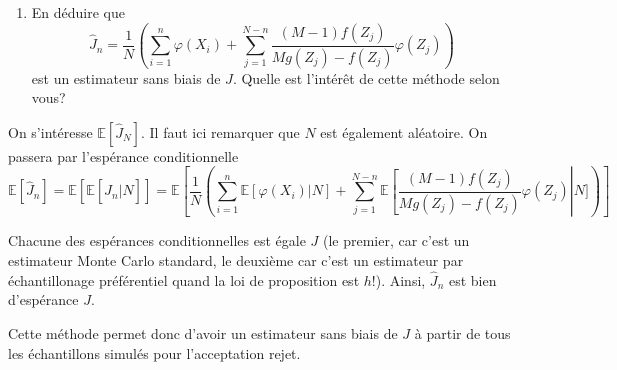 \documentclass[
]{article}
\providecommand{\tightlist}{%
  \setlength{\itemsep}{0pt}\setlength{\parskip}{0pt}}
\newenvironment{Correction}%
  { \vspace{\baselineskip}\begin{mdframed}[backgroundcolor=my_green]}%
  {\end{mdframed}}
\begin{document}
\begin{enumerate}
\def\labelenumi{\arabic{enumi}.}
\setcounter{enumi}{5}
\tightlist
\item
  En déduire que
  \[\hat{J}_n = \frac{1}{N} \left(\sum_{i = 1}^n \varphi(X_i) + \sum_{j = 1}^{N - n} \frac{(M - 1)f(Z_j)}{Mg(Z_j) - f(Z_j)} \varphi(Z_j) \right)\]
  est un estimateur sans biais de \(J\). Quelle est l'intérêt de cette
  méthode selon vous?
\end{enumerate}

\begin{Correction}

On s'intéresse $\mathbb{E}[\hat{J}_N]$. Il faut ici remarquer que $N$ est également aléatoire. 
On passera par l'espérance conditionnelle
$$\mathbb{E}\left[\hat{J}_n\right] = \mathbb{E}\left[\mathbb{E}\left[\hat{J}_n\vert N\right] \right] = \mathbb{E}\left[ \frac{1}{N} \left(\sum_{i = 1}^n \mathbb{E}[\varphi(X_i)\vert N] + \sum_{j = 1}^{N - n} \mathbb{E}\left[\frac{(M - 1)f(Z_j)}{Mg(Z_j) - f(Z_j)} \varphi(Z_j)\right \vert N] \right) \right]$$

Chacune des espérances conditionnelles est égale $J$ (le premier, car c'est un estimateur Monte Carlo standard, le deuxième car c'est un estimateur par échantillonage préférentiel quand la loi de proposition est $h$!). Ainsi, $\hat{J}_n$ est bien d'espérance $J$. 

Cette méthode permet donc d'avoir un estimateur sans biais de $J$ à partir de tous les échantillons simulés pour l'acceptation rejet.
\end{Correction}
\end{document}
